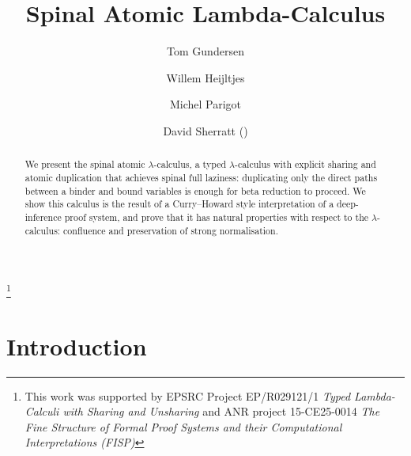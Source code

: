 \documentclass[runningheads]{llncs}
\newcommand\blfootnote[1]{%
  \begingroup
  \renewcommand\thefootnote{}\footnote{#1}%
  \addtocounter{footnote}{-1}%
  \endgroup
}
\begin{document}
%
\title{Spinal Atomic Lambda-Calculus}
%
%
\author{Tom Gundersen \and
Willem Heijltjes\and
Michel Parigot \and
David Sherratt (\Letter)}
%
%
%
\maketitle              %
%
\vspace{-1cm}
\blfootnote{This work was supported by EPSRC Project EP/R029121/1 \emph{Typed Lambda-Calculi with Sharing and Unsharing} and ANR project 15-CE25-0014 \emph{The Fine Structure of Formal Proof Systems and their Computational Interpretations (FISP)}}

\begin{abstract}
We present the spinal atomic $\lambda$-calculus, a typed $\lambda$-calculus with explicit sharing and atomic duplication that achieves spinal full laziness: duplicating only the direct paths between a binder and bound variables is enough for beta reduction to proceed. We show this calculus is the result of a Curry--Howard style interpretation of a deep-inference proof system, and prove that it has natural properties with respect to the $\lambda$-calculus: confluence and preservation of strong normalisation.

\end{abstract}

\section{Introduction}
\end{document}
